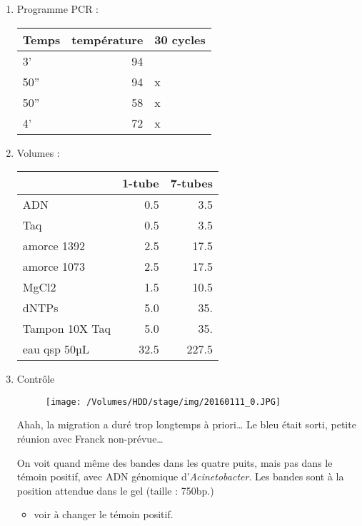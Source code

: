 \documentclass[9pt, oneside, twocolumn]{scrartcl}
\begin{document}
\begin{enumerate}
\item Programme PCR :
\label{sec:orgheadline1}
\begin{center}
\begin{tabular}{lrl}
\toprule
Temps & température & 30 cycles\\
\midrule
3' & 94 & \\
50'' & 94 & x\\
50'' & 58 & x\\
4' & 72 & x\\
\bottomrule
\end{tabular}
\end{center}

\item Volumes :
\label{sec:orgheadline2}
\begin{center}
\begin{tabular}{lrr}
\toprule
 & 1-tube & 7-tubes\\
\midrule
ADN & 0.5 & 3.5\\
Taq & 0.5 & 3.5\\
amorce 1392 & 2.5 & 17.5\\
amorce 1073 & 2.5 & 17.5\\
MgCl2 & 1.5 & 10.5\\
dNTPs & 5.0 & 35.\\
Tampon 10X Taq & 5.0 & 35.\\
\midrule
eau qsp 50µL & 32.5 & 227.5\\
\bottomrule
\end{tabular}
\end{center}

\item Contrôle
\label{sec:orgheadline3}
\begin{figure}[htb]
\centering
\texttt{[image: /Volumes/HDD/stage/img/20160111\_0.JPG]}
\end{figure}

Ahah, la migration a duré trop longtemps à priori… Le bleu était sorti, petite
réunion avec Franck non-prévue…

On voit quand même des bandes dans les quatre puits, mais pas dans le témoin
positif, avec ADN génomique d'\emph{Acinetobacter}. Les bandes sont à la position
attendue dans le gel (taille : 750bp.) 

\begin{itemize}
\item voir à changer le témoin positif.
\end{itemize}
\end{enumerate}
\end{document}
